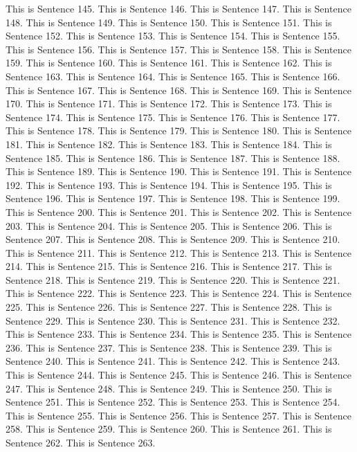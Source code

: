\documentclass{article}
\begin{document}
This is Sentence 145.
This is Sentence 146.
This is Sentence 147.
This is Sentence 148.
This is Sentence 149.
This is Sentence 150.
This is Sentence 151.
This is Sentence 152.
This is Sentence 153.
This is Sentence 154.
This is Sentence 155.
This is Sentence 156.
This is Sentence 157.
This is Sentence 158.
This is Sentence 159.
This is Sentence 160.
This is Sentence 161.
This is Sentence 162.
This is Sentence 163.
This is Sentence 164.
This is Sentence 165.
This is Sentence 166.
This is Sentence 167.
This is Sentence 168.
This is Sentence 169.
This is Sentence 170.
This is Sentence 171.
This is Sentence 172.
This is Sentence 173.
This is Sentence 174.
This is Sentence 175.
This is Sentence 176.
This is Sentence 177.
This is Sentence 178.
This is Sentence 179.
This is Sentence 180.
This is Sentence 181.
This is Sentence 182.
This is Sentence 183.
This is Sentence 184.
This is Sentence 185.
This is Sentence 186.
This is Sentence 187.
This is Sentence 188.
This is Sentence 189.
This is Sentence 190.
This is Sentence 191.
This is Sentence 192.
This is Sentence 193.
This is Sentence 194.
This is Sentence 195.
This is Sentence 196.
This is Sentence 197.
This is Sentence 198.
This is Sentence 199.
This is Sentence 200.
This is Sentence 201.
This is Sentence 202.
This is Sentence 203.
This is Sentence 204.
This is Sentence 205.
This is Sentence 206.
This is Sentence 207.
This is Sentence 208.
This is Sentence 209.
This is Sentence 210.
This is Sentence 211.
This is Sentence 212.
This is Sentence 213.
This is Sentence 214.
This is Sentence 215.
This is Sentence 216.
This is Sentence 217.
This is Sentence 218.
This is Sentence 219.
This is Sentence 220.
This is Sentence 221.
This is Sentence 222.
This is Sentence 223.
This is Sentence 224.
This is Sentence 225.
This is Sentence 226.
This is Sentence 227.
This is Sentence 228.
This is Sentence 229.
This is Sentence 230.
This is Sentence 231.
This is Sentence 232.
This is Sentence 233.
This is Sentence 234.
This is Sentence 235.
This is Sentence 236.
This is Sentence 237.
This is Sentence 238.
This is Sentence 239.
This is Sentence 240.
This is Sentence 241.
This is Sentence 242.
This is Sentence 243.
This is Sentence 244.
This is Sentence 245.
This is Sentence 246.
This is Sentence 247.
This is Sentence 248.
This is Sentence 249.
This is Sentence 250.
This is Sentence 251.
This is Sentence 252.
This is Sentence 253.
This is Sentence 254.
This is Sentence 255.
This is Sentence 256.
This is Sentence 257.
This is Sentence 258.
This is Sentence 259.
This is Sentence 260.
This is Sentence 261.
This is Sentence 262.
This is Sentence 263.
\end{document}
